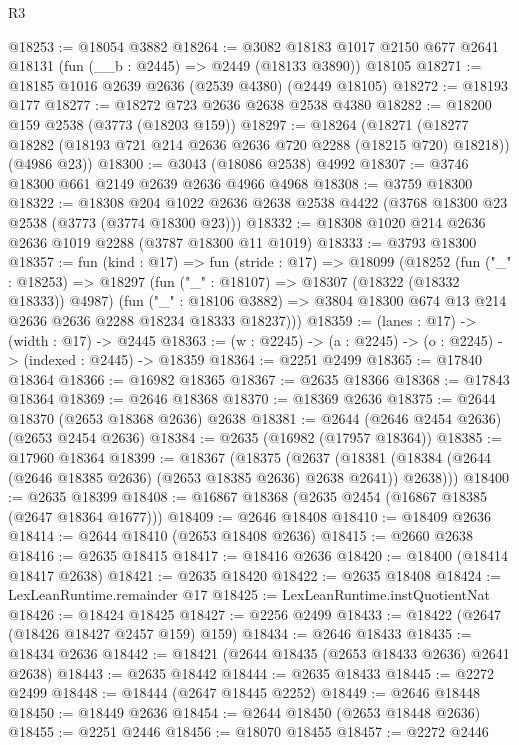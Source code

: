 \begin{lexlean}{R3}
\begin{coremodule}
@18253 := @18054 @3882
@18264 := @3082
    @18183
    @1017
    @2150
    @677
    @2641
    @18131
    (fun (__b : @2445) => @2449 (@18133 @3890))
    @18105
@18271 := @18185 @1016 @2639 @2636 (@2539 @4380) (@2449 @18105)
@18272 := @18193 @177
@18277 := @18272 @723 @2636 @2638 @2538 @4380
@18282 := @18200 @159 @2538 (@3773 (@18203 @159))
@18297 := @18264
    (@18271
      (@18277 @18282 (@18193 @721 @214 @2636 @2636 @720 @2288 (@18215 @720) @18218))
      (@4986 @23))
@18300 := @3043 (@18086 @2538) @4992
@18307 := @3746 @18300 @661 @2149 @2639 @2636 @4966 @4968
@18308 := @3759 @18300
@18322 := @18308
    @204
    @1022
    @2636
    @2638
    @2538
    @4422
    (@3768 @18300 @23 @2538 (@3773 (@3774 @18300 @23)))
@18332 := @18308 @1020 @214 @2636 @2636 @1019 @2288 (@3787 @18300 @11 @1019)
@18333 := @3793 @18300
@18357 := fun (kind : @17) =>
  fun (stride : @17) =>
  @18099
    (@18252
      (fun ("_" : @18253) =>
      @18297
        (fun ("_" : @18107) => @18307 (@18322 (@18332 @18333)) @4987)
        (fun ("_" : @18106 @3882) =>
        @3804 @18300 @674 @13 @214 @2636 @2636 @2288 @18234 @18333 @18237)))
@18359 := (lanes : @17) -> (width : @17) -> @2445
@18363 := (w : @2245) -> (a : @2245) -> (o : @2245) -> (indexed : @2445) -> @18359
@18364 := @2251 @2499
@18365 := @17840 @18364
@18366 := @16982 @18365
@18367 := @2635 @18366
@18368 := @17843 @18364
@18369 := @2646 @18368
@18370 := @18369 @2636
@18375 := @2644 @18370 (@2653 @18368 @2636) @2638
@18381 := @2644 (@2646 @2454 @2636) (@2653 @2454 @2636)
@18384 := @2635 (@16982 (@17957 @18364))
@18385 := @17960 @18364
@18399 := @18367
    (@18375
      (@2637 (@18381 (@18384 (@2644 (@2646 @18385 @2636) (@2653 @18385 @2636) @2638 @2641)) @2638)))
@18400 := @2635 @18399
@18408 := @16867 @18368 (@2635 @2454 (@16867 @18385 (@2647 @18364 @1677)))
@18409 := @2646 @18408
@18410 := @18409 @2636
@18414 := @2644 @18410 (@2653 @18408 @2636)
@18415 := @2660 @2638
@18416 := @2635 @18415
@18417 := @18416 @2636
@18420 := @18400 (@18414 @18417 @2638)
@18421 := @2635 @18420
@18422 := @2635 @18408
@18424 := LexLeanRuntime.remainder @17
@18425 := LexLeanRuntime.instQuotientNat
@18426 := @18424 @18425
@18427 := @2256 @2499
@18433 := @18422 (@2647 (@18426 @18427 @2457 @159) @159)
@18434 := @2646 @18433
@18435 := @18434 @2636
@18442 := @18421 (@2644 @18435 (@2653 @18433 @2636) @2641 @2638)
@18443 := @2635 @18442
@18444 := @2635 @18433
@18445 := @2272 @2499
@18448 := @18444 (@2647 @18445 @2252)
@18449 := @2646 @18448
@18450 := @18449 @2636
@18454 := @2644 @18450 (@2653 @18448 @2636)
@18455 := @2251 @2446
@18456 := @18070 @18455
@18457 := @2272 @2446

\end{coremodule}
\end{lexlean}
